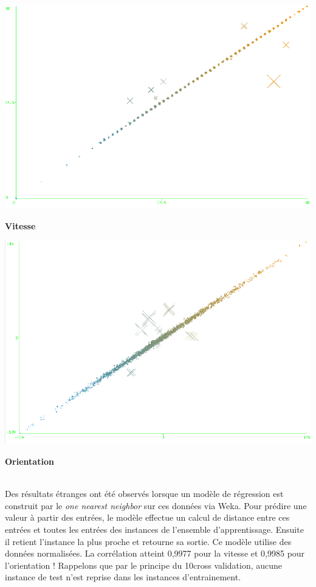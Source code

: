 \begin{minipage}[c]{\mpwekawidth}
 \includegraphics[width=\textwidth]{../figures/1BkSpeed.png}
 \begin{center}
  \textbf{Vitesse}
 \end{center}
\end{minipage}
\begin{minipage}[c]{\mpwekawidth}
 \includegraphics[width=\textwidth]{../figures/IB1.png}
 \begin{center}
  \textbf{Orientation}
 \end{center}
\end{minipage}
\\

Des résultats étranges ont été observés lorsque un modèle de régression est construit par le \emph{one nearest neighbor} sur ces données via Weka.
Pour prédire une valeur à partir des entrées, le modèle effectue un calcul de distance entre ces entrées et toutes les entrées des instances de l'ensemble d'apprentissage.
Ensuite il retient l'instance la plus proche et retourne sa sortie.
Ce modèle utilise des données normalisées.
La corrélation atteint 0,9977 pour la vitesse et 0,9985 pour l'orientation !
Rappelons que par le principe du 10cross validation, aucune instance de test n'est reprise dans les instances d'entrainement.

